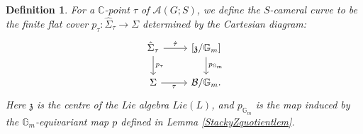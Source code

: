 \documentclass{amsart}
\newtheorem{definition}[theorem]{Definition}
\theoremstyle{remark}
\numberwithin{theorem}{section}
\numberwithin{equation}{section}
\begin{document}
\begin{definition}\label{SCameralcurvedef}
    For a $\mathbb{C}$-point $\tau$ of $\mathcal A(G;S)$, we define the \emph{$S$-cameral curve} to be the finite flat cover $p_\tau:\hat{\Sigma}_{\tau} \rightarrow \Sigma$ determined by the Cartesian diagram:
    \begin{equation}\label{SCameralcurveeqn}
\begin{tikzcd}
\hat{\Sigma}_\tau \arrow[d,"p_\tau"] \arrow[r, "\hat{\tau}"] & {[\mathfrak{z}/\mathbb{G}_m]} \arrow[d, "p_{\mathbb{G}_m}"] \\
\Sigma \arrow[r, "\tau"']       & \mathcal B/\mathbb{G}_m.           
\end{tikzcd}
    \end{equation}
    Here $\mathfrak{z}$ is the centre of the Lie algebra $Lie(L)$, and $p_{\mathbb{G}_m}$ is the map induced by the $\mathbb{G}_m$-equivariant map $p$ defined in Lemma \ref{StackyZquotientlem}.
\end{definition}
\end{document}
